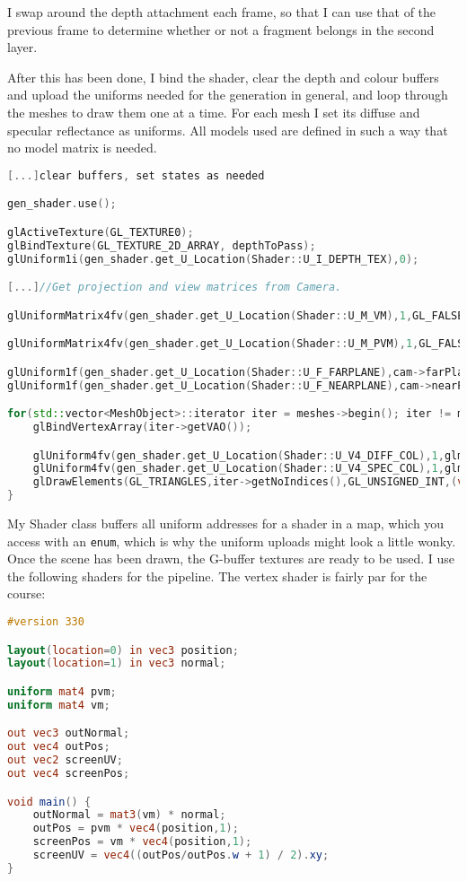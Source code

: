 I swap around the depth attachment each frame, so that I can use that of the previous frame to determine whether or not a fragment belongs in the second layer.

After this has been done, I bind the shader, clear the depth and colour buffers and upload the uniforms needed for the generation in general, and loop through the meshes to draw them one at a time. For each mesh I set its diffuse and specular reflectance as uniforms. All models used are defined in such a way that no model matrix is needed.

\begin{lstlisting}[caption={GBuffer.cpp},language=c++]
[...]clear buffers, set states as needed

gen_shader.use();

glActiveTexture(GL_TEXTURE0);
glBindTexture(GL_TEXTURE_2D_ARRAY, depthToPass);
glUniform1i(gen_shader.get_U_Location(Shader::U_I_DEPTH_TEX),0);

[...]//Get projection and view matrices from Camera.

glUniformMatrix4fv(gen_shader.get_U_Location(Shader::U_M_VM),1,GL_FALSE,glm::value_ptr(vm));

glUniformMatrix4fv(gen_shader.get_U_Location(Shader::U_M_PVM),1,GL_FALSE,glm::value_ptr(pvm));

glUniform1f(gen_shader.get_U_Location(Shader::U_F_FARPLANE),cam->farPlane);
glUniform1f(gen_shader.get_U_Location(Shader::U_F_NEARPLANE),cam->nearPlane);

for(std::vector<MeshObject>::iterator iter = meshes->begin(); iter != meshes->end();iter++) {
	glBindVertexArray(iter->getVAO());

	glUniform4fv(gen_shader.get_U_Location(Shader::U_V4_DIFF_COL),1,glm::value_ptr(iter->diffColor));
	glUniform4fv(gen_shader.get_U_Location(Shader::U_V4_SPEC_COL),1,glm::value_ptr(iter->specColor));
	glDrawElements(GL_TRIANGLES,iter->getNoIndices(),GL_UNSIGNED_INT,(void*) 0);
}
\end{lstlisting}

My Shader class buffers all uniform addresses for a shader in a map, which you access with an \verb=enum=, which is why the uniform uploads might look a little wonky. Once the scene has been drawn, the G-buffer textures are ready to be used. I use the following shaders for the pipeline. The vertex shader is fairly par for the course:

\begin{lstlisting}[caption={gen\_gbuffer.vert},language=GLSL]
#version 330

layout(location=0) in vec3 position;
layout(location=1) in vec3 normal;

uniform mat4 pvm;
uniform mat4 vm;

out vec3 outNormal;
out vec4 outPos;
out vec2 screenUV;
out vec4 screenPos;

void main() {
	outNormal = mat3(vm) * normal;
	outPos = pvm * vec4(position,1);
	screenPos = vm * vec4(position,1);
	screenUV = vec4((outPos/outPos.w + 1) / 2).xy;
}
\end{lstlisting}

